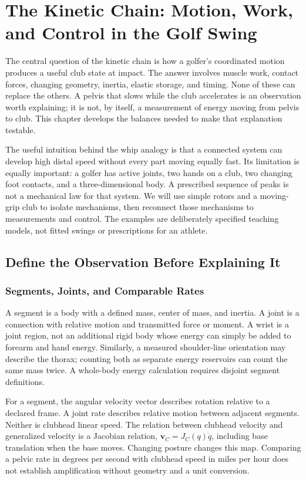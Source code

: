 \chapter{The Kinetic Chain: Motion, Work, and Control in the Golf Swing}
\label{ch:kinetic_chain}

The central question of the kinetic chain is how a golfer's coordinated motion produces a useful club state at impact. The answer involves muscle work, contact forces, changing geometry, inertia, elastic storage, and timing. None of these can replace the others. A pelvis that slows while the club accelerates is an observation worth explaining; it is not, by itself, a measurement of energy moving from pelvis to club. This chapter develops the balances needed to make that explanation testable.

The useful intuition behind the whip analogy is that a connected system can develop high distal speed without every part moving equally fast. Its limitation is equally important: a golfer has active joints, two hands on a club, two changing foot contacts, and a three-dimensional body. A prescribed sequence of peaks is not a mechanical law for that system. We will use simple rotors and a moving-grip club to isolate mechanisms, then reconnect those mechanisms to measurements and control. The examples are deliberately specified teaching models, not fitted swings or prescriptions for an athlete.

\section{Define the Observation Before Explaining It}
\subsection{Segments, Joints, and Comparable Rates}
A segment is a body with a defined mass, center of mass, and inertia. A joint is a connection with relative motion and transmitted force or moment. A wrist is a joint region, not an additional rigid body whose energy can simply be added to forearm and hand energy. Similarly, a measured shoulder-line orientation may describe the thorax; counting both as separate energy reservoirs can count the same mass twice. A whole-body energy calculation requires disjoint segment definitions.

For a segment, the angular velocity vector describes rotation relative to a declared frame. A joint rate describes relative motion between adjacent segments. Neither is clubhead linear speed. The relation between clubhead velocity and generalized velocity is a Jacobian relation, $\mathbf v_C=J_C(q)\dot q$, including base translation when the base moves. Changing posture changes this map. Comparing a pelvic rate in degrees per second with clubhead speed in miles per hour does not establish amplification without geometry and a unit conversion.

